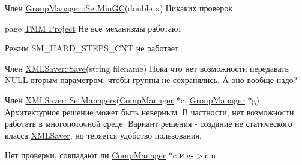 \begin{DoxyDescription}
\item[Член \hyperlink{class_group_manager_a3902f2dd35ec3bad963310f67369a379}{GroupManager::SetMinGC}(double x) ]Никаких проверок 
\end{DoxyDescription}

\label{bug__bug000001}
\hypertarget{bug__bug000001}{}
 
\begin{DoxyDescription}
\item[page \hyperlink{index}{TMM Project} ]Не все механизмы работают 

Режим SM\_\-HARD\_\-STEPS\_\-CNT не работает
\end{DoxyDescription}

\label{bug__bug000025}
\hypertarget{bug__bug000025}{}
 
\begin{DoxyDescription}
\item[Член \hyperlink{class_x_m_l_saver_a3e5cc543b951b654aad70f0b219ce8eb}{XMLSaver::Save}(string filename) ]Пока что нет возможности передавать NULL вторым параметром, чтобы группы не сохранялись. А оно вообще надо? 
\end{DoxyDescription}

\label{bug__bug000024}
\hypertarget{bug__bug000024}{}
 
\begin{DoxyDescription}
\item[Член \hyperlink{class_x_m_l_saver_add45cb0070d5d4a96f0f76fe2ac609ab}{XMLSaver::SetManagers}(\hyperlink{class_comp_manager}{CompManager} $\ast$c, \hyperlink{class_group_manager}{GroupManager} $\ast$g) ]Архитектурное решение может быть неверным. В частности, нет возможности работать в многопоточной среде. Вариант решения -\/ создание не статического класса \hyperlink{class_x_m_l_saver}{XMLSaver}, но теряется удобство пользования. 

Нет проверки, совпадают ли \hyperlink{class_comp_manager}{CompManager} $\ast$c и g-\/$>$cm 
\end{DoxyDescription}